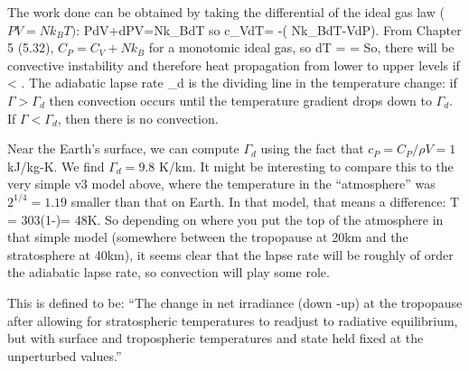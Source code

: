 \documentclass[11pt]{book}
\begin{document}
The work done can be obtained by taking the differential of the ideal gas law ($PV=Nk_BT)$:
\be
PdV+dPV=Nk_BdT\ee
so
\be
c_VdT= -\left( Nk_BdT-VdP\right).
\ee
From Chapter 5 (5.32), $C_P=C_V+Nk_B$ for a monotomic ideal gas, so
\be
dT =  = 
\ee
So, there will be convective instability and therefore heat propagation from lower to upper levels if
\be
{} < \Gamma.
\ee
The adiabatic lapse rate \be
\Gamma_d \equiv {}
\ee
is the dividing line in the temperature change: if $\Gamma>\Gamma_d$ then convection occurs until the temperature gradient drops down to $\Gamma_d$. If $\Gamma< \Gamma_d$, then there is no convection.

Near the Earth's surface, we can compute $\Gamma_d$ using the fact that $c_P=C_P/\rho V=1$ kJ/kg-K. We find $\Gamma_d=9.8$ K/km. It might be interesting to compare this to the very simple v3 model above, where the temperature in the ``atmosphere'' was $2^{1/4}=1.19$ smaller than that on Earth. In that model, that means a difference: 
\be
\Delta T = 303\left(1-\right)= 48K.\ee
So depending on where you put the top of the atmosphere in that simple model (somewhere between the tropopause at 20km and the stratosphere at 40km), it seems clear that the lapse rate will be roughly of order the adiabatic lapse rate, so convection will play some role.

\newcommand\ipcc[1]{{\tt IPCC Report: #1}}


This is defined to be: ``The change in net irradiance (down -up) at the tropopause after allowing for stratospheric temperatures to readjust to radiative equilibrium, but with surface and tropospheric temperatures and state held fixed at the unperturbed values.'' 

\end{document}
